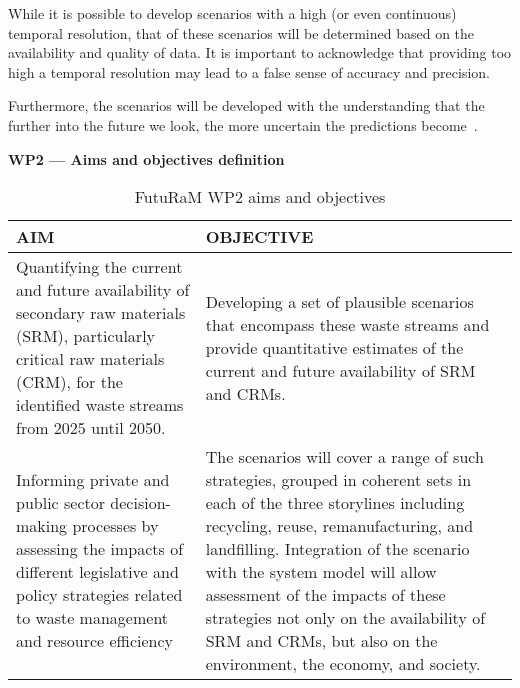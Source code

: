 While it is possible to develop scenarios with a high (or even continuous) temporal resolution, that of these scenarios will be determined based on the availability and quality of data. It is important to acknowledge that providing too high a temporal resolution may lead to a false sense of accuracy and precision.

Furthermore, the scenarios will be developed with the understanding that the further into the future we look, the more uncertain the predictions become~\cite{amer2013,spaniol2017scenarios,kahn1967scenarios}.

\begin{table}[h]
  \textbf{WP2 --- Aims and objectives definition}
  \centering
  \small
  \caption{FutuRaM WP2 aims and objectives}\label{tab:fm-wp2objectives}
  \begin{tabular}{|L{7cm}|L{7cm}|}
    \hline
     \color{white}\textbf{AIM}                                                                                                                                           & \color{white}\textbf{OBJECTIVE}                                                                                                                                                                                                                                                                                                                                                                      \\ \hline
    Quantifying the current and future availability of secondary raw materials (SRM), particularly critical raw materials (CRM), for the identified waste streams from 2025 until 2050.       &
    Developing a set of plausible scenarios that encompass these waste streams and provide quantitative estimates of the current and future availability of SRM and CRMs.                                                                                                                                                                                                                                                                                                                                                                                                                            \\
    \hline
    Informing private and public sector decision-making processes by assessing the impacts of different legislative and policy strategies related to waste management and resource efficiency & The scenarios will cover a range of such strategies, grouped in coherent sets in each of the three storylines including recycling, reuse, remanufacturing, and landfilling. \newline Integration of the scenario with the system model will allow assessment of the impacts of these strategies not only on the availability of SRM and CRMs, but also on the environment, the economy, and society. \\
    \hline
  \end{tabular}
\end{table}



